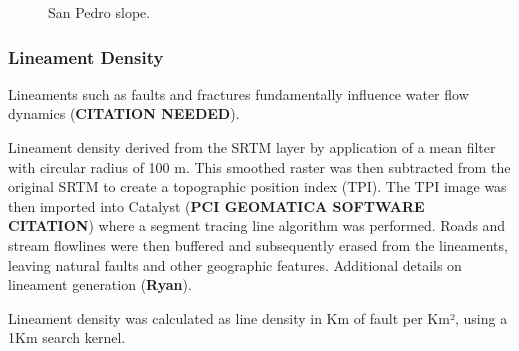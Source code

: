 \documentclass[
]{agujournal2019}
\begin{document}
\begin{figure}
{}

\caption{\label{fig-slope}San Pedro slope.}

\end{figure}%

\subsubsection{Lineament Density}\label{lineament-density}

Lineaments such as faults and fractures fundamentally influence water
flow dynamics (\textbf{CITATION NEEDED}).

Lineament density derived from the SRTM layer by application of a mean
filter with circular radius of 100 m. This smoothed raster was then
subtracted from the original SRTM to create a topographic position index
(TPI). The TPI image was then imported into Catalyst (\textbf{PCI
GEOMATICA SOFTWARE CITATION}) where a segment tracing line algorithm was
performed. Roads and stream flowlines were then buffered and
subsequently erased from the lineaments, leaving natural faults and
other geographic features. Additional details on lineament generation
(\textbf{Ryan}).

Lineament density was calculated as line density in Km of fault per Km²,
using a 1Km search kernel.
\end{document}
